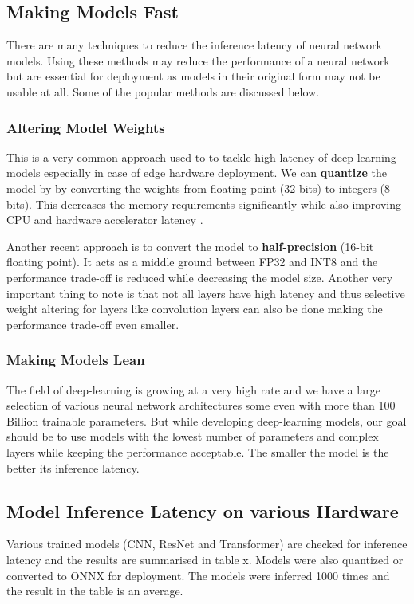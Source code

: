 \subsection{Making Models Fast}
There are many techniques to reduce the inference latency of neural network models. Using these methods may reduce the performance of a neural network but are essential for deployment as models in their original form may not be usable at all. Some of the popular methods are discussed below.

\subsubsection{Altering Model Weights}
This is a very common approach used to to tackle high latency of deep learning models especially in case of edge hardware deployment. We can \textbf{quantize} the model by by converting the weights from floating point (32-bits) to integers (8 bits). This decreases the memory requirements significantly while also improving CPU and hardware accelerator latency \citep{FastModels}. 

Another recent approach is to convert the model to \textbf{half-precision} (16-bit floating point). It acts as a middle ground between FP32 and INT8 and the performance trade-off is reduced while decreasing the model size. Another very important thing to note is that not all layers have high latency and thus selective weight altering for layers like convolution layers can also be done making the performance trade-off even smaller.

\subsubsection{Making Models Lean}
The field of deep-learning is growing at a very high rate and we have a large selection of various neural network architectures some even with more than 100 Billion trainable parameters. But while developing deep-learning models, our goal should be to use models with the lowest number of parameters and complex layers while keeping the performance acceptable. The smaller the model is the better its inference latency. 
\subsection{Model Inference Latency on various Hardware}
Various trained models (CNN, ResNet and Transformer) are checked for inference latency and the results are summarised in table x. Models were also quantized or converted to ONNX for deployment. The models were inferred 1000 times and the result in the table is an average.

